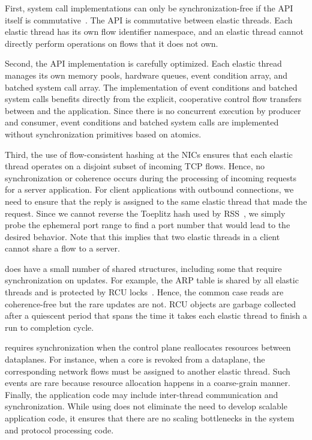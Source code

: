 First, system call implementations can only be synchronization-free if
the API itself is
commutative~\cite{DBLP:conf/sosp/ClementsKZMK13}. The \ix API is
commutative between elastic threads. Each elastic thread has its own
flow identifier namespace, and an elastic thread cannot directly perform
operations on flows that it does not own.

Second, the API implementation is carefully optimized.  Each elastic
thread manages its own memory pools, hardware queues, event condition
array, and batched system call array. The implementation of event conditions and
batched system calls benefits directly from the explicit, cooperative
control flow transfers between \ix and the application.%
Since there is no concurrent execution by producer and
consumer, event conditions and batched system calls are implemented
without synchronization primitives based on atomics.

Third, the use of flow-consistent hashing at the NICs ensures that
each elastic thread operates on a disjoint subset of incoming TCP
flows. Hence, no synchronization or coherence occurs during the
processing of incoming requests for a server application. For client
applications with outbound connections, we need to ensure that the
reply is assigned to the same elastic thread that made the
request. Since we cannot reverse the Toeplitz hash used by
RSS~\cite{url:rss}, we simply probe the ephemeral port range to find a
port number that would lead to the desired behavior. Note that this
implies that two elastic threads in a client cannot share a flow to a
server.

\ix does have a small number of shared structures, including some that
require synchronization on updates.  For example, the ARP table is
shared by all elastic threads and is protected by RCU
locks~\cite{mckenney1998read}. Hence, the common case reads are
coherence-free but the rare updates are not.
RCU objects are garbage collected after a quiescent period that
spans the time it takes each elastic thread to finish a run to
completion cycle.
%

\ix requires synchronization when the control plane reallocates
resources between dataplanes.  For instance, when a core is revoked
from a dataplane, the corresponding network flows must be assigned
to another elastic thread. Such events are rare because resource
allocation happens in a coarse-grain manner. Finally, the application
code may include inter-thread communication and synchronization. While
using \ix does not eliminate the need to develop scalable application
code, it ensures that there are no scaling bottlenecks in the system
and protocol processing code.

